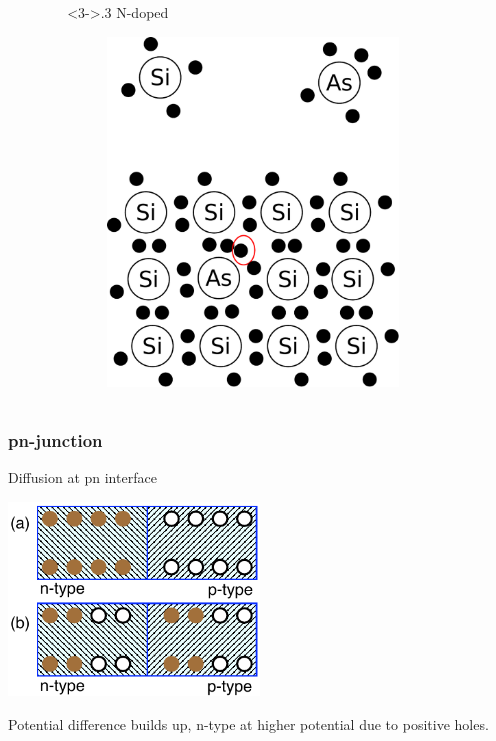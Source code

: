 \documentclass[beamer]{standalone}
\begin{document}
\begin{frame}
\begin{columns}[t]
\begin{column}
\begin{figure}
    \end{figure}
  \end{column}
  \begin{column}<3->{.3\textwidth}
    N-doped
    \begin{figure}
      \includegraphics[width=0.80\textwidth]{./pics/ndopped}
    \end{figure}
  \end{column}
 \end{columns}
\end{frame}

\begin{frame}
 \frametitle{pn-junction}
 \begin{block}{Diffusion at pn interface}
  \begin{center}
   \includegraphics[width=0.5\textwidth]{pics/pn_junction}
  \end{center}
  Potential difference builds up, n-type at higher potential due to positive holes.
 \end{block}
\end{frame}
\end{document}
